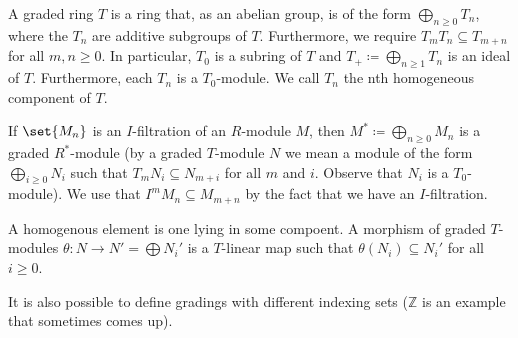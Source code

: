 A graded ring $T$ is a ring that, as an abelian group, is of the form
$\bigoplus_{n\geq 0} T_n$, where the $T_n$ are additive subgroups of $T$. Furthermore,
we require $T_mT_n \subseteq T_{m+n}$ for all $m, n \geq 0$. In particular,
$T_0$ is a subring of $T$ and $T_+\coloneqq \bigoplus_{n\geq 1} T_n$ is an ideal
of $T$. Furthermore, each $T_n$ is a $T_0$-module. We call $T_n$ the nth
homogeneous component of $T$.

If $\set{M_n}$ is an $I$-filtration of an $R$-module $M$, then
$M^*\coloneqq \bigoplus_{n\geq 0} M_n$ is a graded $R^*$-module (by a graded $T$-module
$N$ we mean a module of the form $\bigoplus_{i\geq 0} N_i$ such that $T_mN_i \subseteq N_{m+i}$
for all $m$ and $i$. Observe that $N_i$ is a $T_0$-module). We use that
$I^mM_n \subseteq M_{m+n}$ by the fact that we have an $I$-filtration.

A homogenous element is one lying in some compoent. A morphism of graded
$T$-modules $\theta\colon N\to N' = \bigoplus N_i'$ is a $T$-linear map such
that $\theta(N_i) \subseteq N_i'$ for all $i\geq 0$.

It is also possible to define gradings with different indexing sets ($\mathbb{Z}$ is
an example that sometimes comes up).
